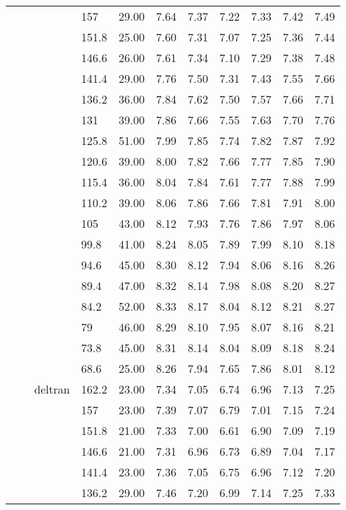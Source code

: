 \begin{longtable}{llllrrrrrrr}
   &  &  & 157 & 29.00 & 7.64 & 7.37 & 7.22 & 7.33 & 7.42 & 7.49 \\ 
   &  &  & 151.8 & 25.00 & 7.60 & 7.31 & 7.07 & 7.25 & 7.36 & 7.44 \\ 
   &  &  & 146.6 & 26.00 & 7.61 & 7.34 & 7.10 & 7.29 & 7.38 & 7.48 \\ 
   &  &  & 141.4 & 29.00 & 7.76 & 7.50 & 7.31 & 7.43 & 7.55 & 7.66 \\ 
   &  &  & 136.2 & 36.00 & 7.84 & 7.62 & 7.50 & 7.57 & 7.66 & 7.71 \\ 
   &  &  & 131 & 39.00 & 7.86 & 7.66 & 7.55 & 7.63 & 7.70 & 7.76 \\ 
   &  &  & 125.8 & 51.00 & 7.99 & 7.85 & 7.74 & 7.82 & 7.87 & 7.92 \\ 
   &  &  & 120.6 & 39.00 & 8.00 & 7.82 & 7.66 & 7.77 & 7.85 & 7.90 \\ 
   &  &  & 115.4 & 36.00 & 8.04 & 7.84 & 7.61 & 7.77 & 7.88 & 7.99 \\ 
   &  &  & 110.2 & 39.00 & 8.06 & 7.86 & 7.66 & 7.81 & 7.91 & 8.00 \\ 
   &  &  & 105 & 43.00 & 8.12 & 7.93 & 7.76 & 7.86 & 7.97 & 8.06 \\ 
   &  &  & 99.8 & 41.00 & 8.24 & 8.05 & 7.89 & 7.99 & 8.10 & 8.18 \\ 
   &  &  & 94.6 & 45.00 & 8.30 & 8.12 & 7.94 & 8.06 & 8.16 & 8.26 \\ 
   &  &  & 89.4 & 47.00 & 8.32 & 8.14 & 7.98 & 8.08 & 8.20 & 8.27 \\ 
   &  &  & 84.2 & 52.00 & 8.33 & 8.17 & 8.04 & 8.12 & 8.21 & 8.27 \\ 
   &  &  & 79 & 46.00 & 8.29 & 8.10 & 7.95 & 8.07 & 8.16 & 8.21 \\ 
   &  &  & 73.8 & 45.00 & 8.31 & 8.14 & 8.04 & 8.09 & 8.18 & 8.24 \\ 
   &  &  & 68.6 & 25.00 & 8.26 & 7.94 & 7.65 & 7.86 & 8.01 & 8.12 \\ 
   &  & deltran & 162.2 & 23.00 & 7.34 & 7.05 & 6.74 & 6.96 & 7.13 & 7.25 \\ 
   &  &  & 157 & 23.00 & 7.39 & 7.07 & 6.79 & 7.01 & 7.15 & 7.24 \\ 
   &  &  & 151.8 & 21.00 & 7.33 & 7.00 & 6.61 & 6.90 & 7.09 & 7.19 \\ 
   &  &  & 146.6 & 21.00 & 7.31 & 6.96 & 6.73 & 6.89 & 7.04 & 7.17 \\ 
   &  &  & 141.4 & 23.00 & 7.36 & 7.05 & 6.75 & 6.96 & 7.12 & 7.20 \\ 
   &  &  & 136.2 & 29.00 & 7.46 & 7.20 & 6.99 & 7.14 & 7.25 & 7.33 \\ 

\end{longtable}
